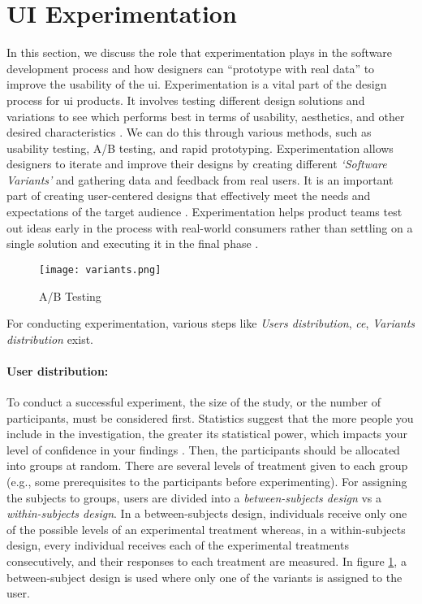 \section{UI Experimentation}
\label{background:section:experimentproduct}
In this section, we discuss the role that experimentation plays in the software development process and how designers can ``prototype with real data'' to improve the usability of the \ac{ui}.
Experimentation is a vital part of the design process for \ac{ui} products. 
It involves testing different design solutions and variations to see which performs best in terms of usability, aesthetics, and other desired characteristics \cite{article:controlled:experiements}. 
We can do this through various methods, such as usability testing, A/B testing, and rapid prototyping.
Experimentation allows designers to iterate and improve their designs by creating different \textit{`Software Variants'} and gathering data and feedback from real users.
It is an important part of creating user-centered designs that effectively meet the needs and expectations of the target audience \cite{article:experiments:lindgren}.
Experimentation helps product teams test out ideas early in the process with real-world consumers rather than settling on a single solution and executing it in the final phase \cite{misc:CE:miklos}.

\begin{figure}[htbp!]
  \centering    
  \texttt{[image: variants.png]}
  \caption[A/B Testing]{A/B Testing} 
  \label{fig:background:abtesting}
\end{figure}
For conducting experimentation, various steps like \textit{Users distribution}, \textit{\ac{ce}}, \textit{Variants distribution} exist.

\paragraph{User distribution:} To conduct a successful experiment, the size of the study, or the number of participants, must be considered first.
Statistics suggest that the more people you include in the investigation, the greater its statistical power, which impacts your level of confidence in your findings \cite{misc:experimentation:users}.
Then, the participants should be allocated into groups at random. 
There are several levels of treatment given to each group (e.g., some prerequisites to the participants before experimenting).
For assigning the subjects to groups, users are divided into a \textit{between-subjects design} vs a \textit{within-subjects design}.
In a between-subjects design, individuals receive only one of the possible levels of an experimental treatment whereas, in a within-subjects design, every individual receives each of the experimental treatments consecutively, and their responses to each treatment are measured.
In figure \ref{fig:background:abtesting}, a between-subject design is used where only one of the variants is assigned to the user.

